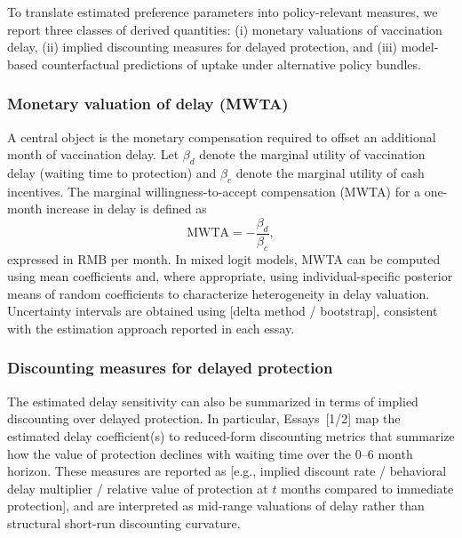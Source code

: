 \documentclass[doublespacing]{utdthesis}
\begin{document}
To translate estimated preference parameters into policy-relevant measures, we report three classes of derived quantities: (i) monetary valuations of vaccination delay, (ii) implied discounting measures for delayed protection, and (iii) model-based counterfactual predictions of uptake under alternative policy bundles.

\subsubsection{Monetary valuation of delay (MWTA)}
A central object is the monetary compensation required to offset an additional month of vaccination delay. Let $\beta_{d}$ denote the marginal utility of vaccination delay (waiting time to protection) and $\beta_{c}$ denote the marginal utility of cash incentives. The marginal willingness-to-accept compensation (MWTA) for a one-month increase in delay is defined as
\begin{equation}
\text{MWTA} = -\frac{\beta_{d}}{\beta_{c}},
\label{eq:mwta}
\end{equation}
expressed in RMB per month. In mixed logit models, MWTA can be computed using mean coefficients and, where appropriate, using individual-specific posterior means of random coefficients to characterize heterogeneity in delay valuation. Uncertainty intervals are obtained using [delta method / bootstrap], consistent with the estimation approach reported in each essay.

\subsubsection{Discounting measures for delayed protection}
The estimated delay sensitivity can also be summarized in terms of implied discounting over delayed protection. In particular, Essays~[1/2] map the estimated delay coefficient(s) to reduced-form discounting metrics that summarize how the value of protection declines with waiting time over the 0--6 month horizon. These measures are reported as [e.g., implied discount rate / behavioral delay multiplier / relative value of protection at $t$ months compared to immediate protection], and are interpreted as mid-range valuations of delay rather than structural short-run discounting curvature.
\end{document}
